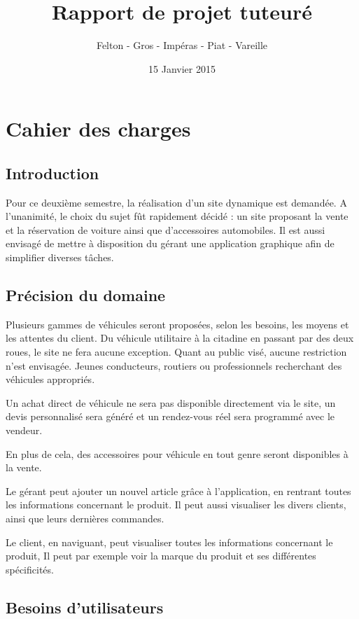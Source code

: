 \documentclass[a4paper]{article}
\title{\Huge \textbf{Rapport de projet tuteuré}}
\author{\Large Felton - Gros - Impéras - Piat - Vareille}
\date{15 Janvier 2015}
\begin{document}
\maketitle
\newpage

\tableofcontents
\newpage

\section{Cahier des charges}
	\subsection*{Introduction}
	
	Pour ce deuxième semestre, la réalisation d'un site dynamique est demandée. A l'unanimité, le choix du sujet fût rapidement décidé : un site proposant la vente et la réservation de voiture ainsi que d'accessoires automobiles. Il est aussi envisagé de mettre à disposition du gérant une application graphique afin de simplifier diverses tâches.
	\subsection{Précision du domaine}
	
	Plusieurs gammes de véhicules seront proposées, selon les besoins, les moyens et les attentes du client. Du véhicule utilitaire à la citadine en passant par des deux roues, le site ne fera aucune exception. Quant au public visé, aucune restriction n'est envisagée. Jeunes conducteurs, routiers ou professionnels recherchant des véhicules appropriés.
	
	Un achat direct de véhicule ne sera pas disponible directement via le site, un devis personnalisé sera généré et un rendez-vous réel sera programmé avec le vendeur.
	
	En plus de cela, des accessoires pour véhicule en tout genre seront disponibles à la vente.
	
	Le gérant peut ajouter un nouvel article grâce à l'application, en rentrant toutes les informations concernant le produit. Il peut aussi visualiser les divers clients, ainsi que leurs dernières commandes.
	
	Le client, en naviguant, peut visualiser toutes les informations concernant le produit, Il peut par exemple voir la marque du produit et ses différentes spécificités. 
	\subsection{Besoins d'utilisateurs}
\end{document}
